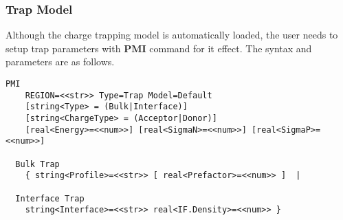\documentclass[oneside,12pt]{cgd_book}
\begin{document}
\par
\subsubsection{Trap Model}
Although the charge trapping model is automatically loaded, the user needs to setup trap parameters with
$\mathbf{PMI}$ command for it effect. The syntax and parameters are as follows.
\par
\begin{lstlisting}[style=GeniusCmd]
PMI
    REGION=<<str>> Type=Trap Model=Default
    [string<Type> = (Bulk|Interface)]
    [string<ChargeType> = (Acceptor|Donor)]
    [real<Energy>=<<num>>] [real<SigmaN>=<<num>>] [real<SigmaP>=<<num>>]

  Bulk Trap
    { string<Profile>=<<str>> [ real<Prefactor>=<<num>> ]  |

  Interface Trap
    string<Interface>=<<str>> real<IF.Density>=<<num>> }
\end{lstlisting}
\end{document}
